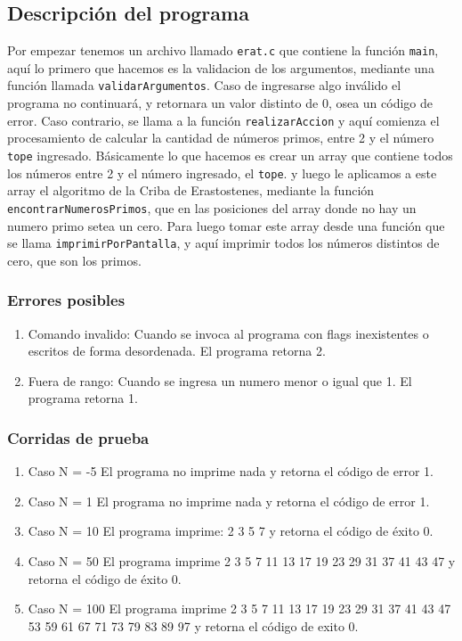 \documentclass[a4paper,10pt]{article}
\begin{document}
\subsection {{\normalsize Descripción del programa}}

Por empezar tenemos un archivo llamado \texttt{erat.c} que contiene la función
\texttt{main}, aquí lo primero que hacemos es la validacion de los argumentos, mediante 
una función llamada \texttt{validarArgumentos}. Caso de ingresarse algo inválido 
el programa no continuará, y retornara un valor distinto de 0, osea un código de error. Caso contrario, 
se llama a la función \texttt{realizarAccion} y aquí comienza el procesamiento de calcular 
la cantidad de números primos, entre 2 y el número \texttt{tope} ingresado. Básicamente lo que hacemos es 
crear un array que contiene todos los números entre 2 y el número ingresado, el \texttt{tope}. 
y luego le aplicamos a este array el algoritmo de la Criba de Erastostenes, mediante la función \texttt{encontrarNumerosPrimos},
que en las posiciones del array donde no hay un numero primo setea un cero.
Para luego tomar este array desde una función que se llama \texttt{imprimirPorPantalla}, y aquí imprimir todos los números distintos
de cero, que son los primos.

\subsubsection {{\normalsize Errores posibles}}

\begin{enumerate}
\item Comando invalido: Cuando se invoca al programa con flags inexistentes o escritos de forma desordenada. El programa retorna 2.
\item Fuera de rango: Cuando se ingresa un numero menor o igual que 1. El programa retorna 1. 
\end{enumerate}

\subsubsection {{\normalsize Corridas de prueba}}

\begin{enumerate}
\item Caso N = -5
El programa no imprime nada y retorna el código de error 1.
\item Caso N = 1
El programa no imprime nada y retorna el código de error 1. 
\item Caso N = 10
El programa imprime: 2 3 5 7 y retorna el código de éxito 0.
\item Caso N = 50
El programa imprime 2 3 5 7 11 13 17 19 23 29 31 37 41 43 47 y retorna el código de éxito 0.
\item Caso N = 100
El programa imprime 2 3 5 7 11 13 17 19 23 29 31 37 41 43 47 53 59 61 67 71 73 79 83 89 97 y retorna el código de exito 0.  
\end{enumerate}
	
\end{document}
